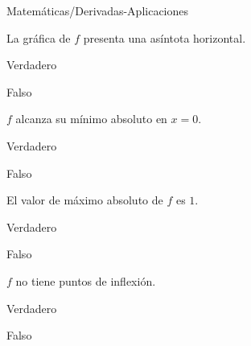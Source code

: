 \documentclass[12pt]{article}
\begin{document}
\begin{quiz}{Matemáticas/Derivadas-Aplicaciones}
\begin{cloze}
		\begin{multi}[shuffle=true,numbering=none,horizontal]
			La gráfica de $f$ presenta una asíntota horizontal.
			\item* Verdadero
			\item Falso
		\end{multi}						
		
		\begin{multi}[shuffle=true,numbering=none, horizontal]
			$f$ alcanza su mínimo absoluto en $x=0$.
			\item Verdadero
			\item* Falso
		\end{multi}
		
		\begin{multi}[shuffle=true,numbering=none, horizontal]
			El valor de máximo absoluto de $f$ es $1$.
			\item* Verdadero
			\item Falso	
		\end{multi}		
		
		\begin{multi}[shuffle=true,numbering=none,horizontal]
			$f$ no tiene puntos de inflexión.
			\item Verdadero
			\item* Falso				
		\end{multi}
	\end{cloze}	
	
\end{quiz}
\end{document}
